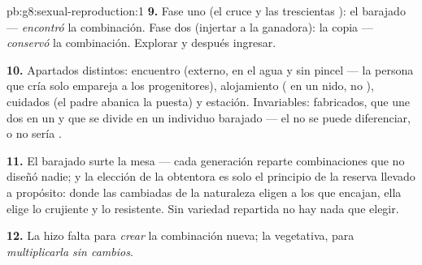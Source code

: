\begin{solution}{pb:g8:sexual-reproduction:1}
\textbf{9.} Fase uno (el cruce y las trescientas ): el
barajado --- \emph{encontró} la combinación. Fase dos (injertar a la
ganadora): la copia --- \emph{conservó} la combinación. Explorar y
después ingresar.

\textbf{10.} Apartados distintos: encuentro (externo, en el agua y sin
pincel --- la persona que cría solo empareja a los progenitores),
alojamiento ( en un nido, no ), cuidados (el padre
abanica la puesta) y estación. Invariables:  fabricados,
 que une dos en un  y  que se divide en un
individuo barajado --- el  no se puede diferenciar, o no sería
.

\textbf{11.} El barajado surte la mesa --- cada generación reparte
combinaciones que no diseñó nadie; y la elección de la obtentora es
solo el principio de la reserva llevado a propósito: donde las
 cambiadas de la naturaleza eligen a los que encajan, ella
elige lo crujiente y lo resistente. Sin variedad repartida no hay nada
que elegir.

\textbf{12.} La  hizo falta para \emph{crear} la
combinación nueva; la vegetativa, para \emph{multiplicarla sin
cambios}.
\end{solution}
